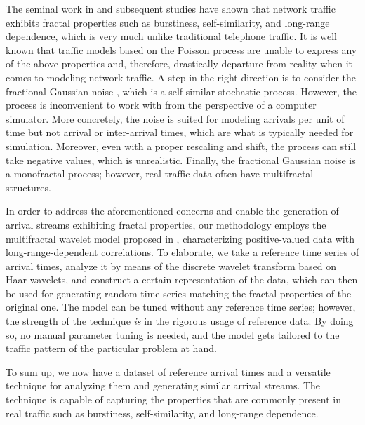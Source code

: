 The seminal work in \cite{leland1994} and subsequent studies have shown that
network traffic exhibits fractal properties such as burstiness, self-similarity,
and long-range dependence, which is very much unlike traditional telephone
traffic. It is well known that traffic models based on the Poisson process
\cite{lifshits2014} are unable to express any of the above properties and,
therefore, drastically departure from reality when it comes to modeling network
traffic. A step in the right direction is to consider the fractional Gaussian
noise \cite{lifshits2014}, which is a self-similar stochastic process. However,
the process is inconvenient to work with from the perspective of a computer
simulator. More concretely, the noise is suited for modeling arrivals per unit
of time but not arrival or inter-arrival times, which are what is typically
needed for simulation. Moreover, even with a proper rescaling and shift, the
process can still take negative values, which is unrealistic. Finally, the
fractional Gaussian noise is a monofractal process; however, real traffic data
often have multifractal structures.

In order to address the aforementioned concerns and enable the generation of
arrival streams exhibiting fractal properties, our methodology employs the
multifractal wavelet model proposed in \cite{riedi1999}, characterizing
positive-valued data with long-range-dependent correlations. To elaborate, we
take a reference time series of arrival times, analyze it by means of the
discrete wavelet transform based on Haar wavelets, and construct a certain
representation of the data, which can then be used for generating random time
series matching the fractal properties of the original one. The model can be
tuned without any reference time series; however, the strength of the technique
\emph{is} in the rigorous usage of reference data. By doing so, no manual
parameter tuning is needed, and the model gets tailored to the traffic pattern
of the particular problem at hand.

To sum up, we now have a dataset of reference arrival times and a versatile
technique for analyzing them and generating similar arrival streams. The
technique is capable of capturing the properties that are commonly present in
real traffic such as burstiness, self-similarity, and long-range dependence.
